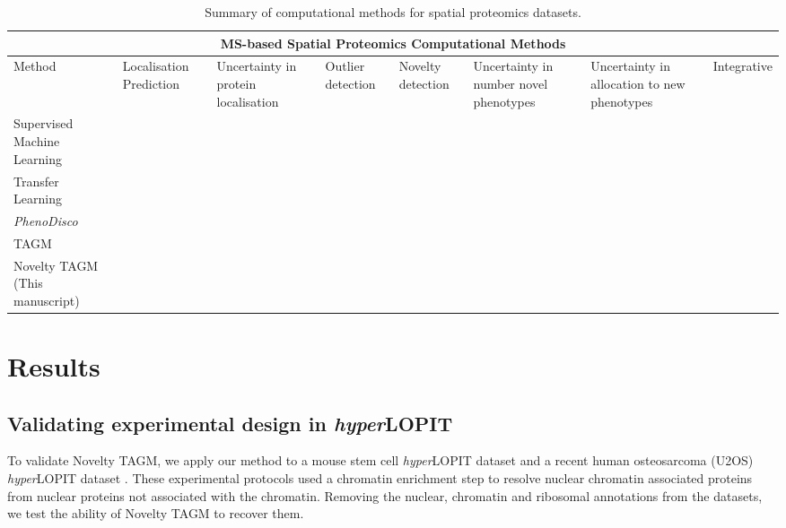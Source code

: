 \documentclass[12pt,english]{article}
\newcommand{\xmark}{\ding{55}}
\begin{document}
\begin{table}[h]
	\centering
	\footnotesize
	\hspace*{-1.5cm}
	\begin{tabular}{ |p{2.5cm}|p{2cm}|p{2cm}|p{1.5cm}|p{2cm}|p{2cm}|p{2cm}|p{2cm}|  }
		\hline
		\multicolumn{8}{|c|}{MS-based Spatial Proteomics Computational Methods} \\
		\hline
		 Method & Localisation Prediction & Uncertainty in protein localisation & Outlier detection  & Novelty detection & Uncertainty in number novel phenotypes & Uncertainty in allocation to new phenotypes & Integrative \\
		\hline
		\hline
		Supervised Machine Learning\citep{Gatto:2014b}  & \vfill\hfil \checkmark & \vfill\hfil\xmark & \vfill\hfil\xmark &\vfill\hfil\xmark&\vfill\hfil\xmark&\vfill\hfil\xmark& \vfill\hfil\xmark\\
		\hline
		Transfer Learning \citep{Breckels:2016}  & \vfill\hfil \checkmark  & \vfill\hfil\xmark& \vfill\hfil\xmark &\vfill\hfil\xmark&\vfill\hfil\xmark& \vfill\hfil\xmark&\vfill\hfil \checkmark\\
		\hline
		\textit{PhenoDisco} \citep{Breckels:2013}  & \vfill\hfil\xmark &\vfill\hfil\xmark &\vfill\hfil \checkmark &\vfill\hfil \checkmark&\vfill\hfil\xmark&\vfill\hfil\xmark& \vfill\hfil\xmark\\
		\hline
		TAGM \citep{Crook:2018}& \vfill\hfil \checkmark & \vfill\hfil \checkmark & \vfill\hfil \checkmark& \vfill\hfil\xmark&\vfill\hfil\xmark&\vfill\hfil\xmark&\vfill\hfil\xmark\\
		\hline
		Novelty TAGM (This manuscript)&  \vfill\hfil \checkmark & \vfill\hfil \checkmark &\vfill\hfil \checkmark & \vfill\hfil \checkmark&\vfill\hfil \checkmark&\vfill\hfil \checkmark& \vfill\hfil\xmark\\
		\hline
		\hline
	\end{tabular}
	\caption{Summary of computational methods for spatial  proteomics datasets.}
	\label{table:methods}
\end{table}
\clearpage
\section{Results}
\subsection{Validating experimental design in \textit{hyper}LOPIT}
To validate Novelty TAGM, we apply our method to a mouse stem cell \textit{hyper}LOPIT dataset \citep{hyper} and a recent human osteosarcoma (U2OS) \textit{hyper}LOPIT dataset \citep{Thul:2017, DC:2018}. These experimental protocols used a chromatin enrichment step to resolve nuclear chromatin associated proteins from nuclear proteins not associated with the chromatin. Removing the nuclear, chromatin and ribosomal annotations from the datasets, we test the ability of Novelty TAGM to recover them.
\end{document}
